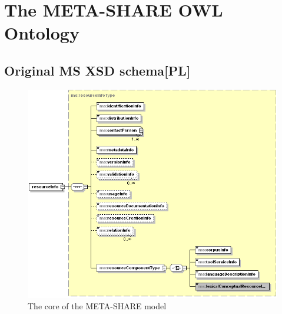 \documentclass{llncs}
\begin{document}
\section{The META-SHARE OWL Ontology}
\label{sec:ontology}
\subsection{Original MS XSD schema[PL]}
\label{sec:xsd}

\begin{figure}
    \centering
    \includegraphics[width=.8\textwidth]{figure_resource.png}
    \caption{\label{fig:resource}The core of the META-SHARE model}
\end{figure}
\end{document}
